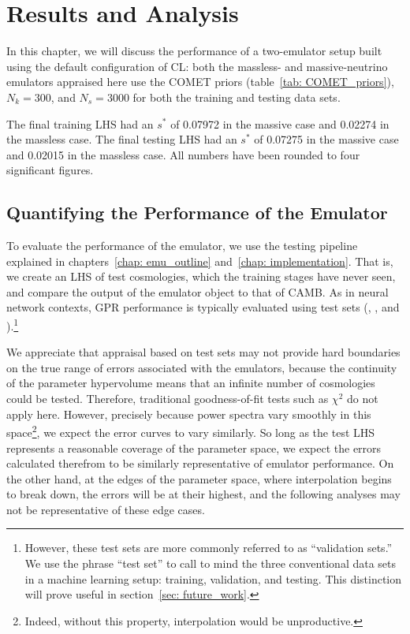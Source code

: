 \chapter{Results and Analysis}
\label{chap: results}

In this chapter, we will discuss the performance of a two-emulator setup
built using the default configuration of CL: both the massless- and
massive-neutrino emulators appraised here use the COMET priors
(table~\ref{tab: COMET_priors}), $N_k = 300$, and $N_s = 3000$ for both the
training and testing data sets.

The final training LHS had an $s^*$ of 0.07972 in the massive case and 
0.02274 in the massless case. The final testing LHS had an $s^*$ of 0.07275 in 
the massive case and 0.02015 in the massless case. All numbers have been 
rounded to four significant figures.

\section{Quantifying the Performance of the Emulator}

To evaluate the performance of the emulator, we use the testing pipeline
explained in chapters~\ref{chap: emu_outline} and~\ref{chap: implementation}.
That is, we create an LHS of test cosmologies, which the training stages have
never seen, and compare the output of the emulator object to that of
CAMB. As in neural network contexts, GPR performance is typically evaluated
using test sets (\citealp{Mancini}, \citealp{Arico}, and
\citealp{Eggemeier}).\footnote{However, these test sets are
more commonly referred to as ``validation sets.'' We use the phrase
``test set'' to call to mind the three conventional data sets in a machine
learning setup: training, validation, and testing. This distinction will
prove useful in section~\ref{sec: future_work}.}

We appreciate that appraisal based on test sets
may not provide hard boundaries on the true
range of errors associated with the emulators,
because the continuity of the parameter hypervolume means that an infinite
number of cosmologies could be tested. Therefore, traditional
goodness-of-fit tests such as $\chi^2$ do not apply here.
However, precisely because
power spectra vary smoothly in this space\footnote{Indeed, without this
property, interpolation would be unproductive.}, we expect the error 
curves to vary similarly. So long as the test LHS represents a reasonable
coverage of the parameter space, we expect the errors calculated therefrom to
be similarly representative of emulator performance. On the other
hand, at the edges of the parameter space, where interpolation begins to
break down, the errors will be at their highest, and the following analyses
may not be representative of these edge cases.

